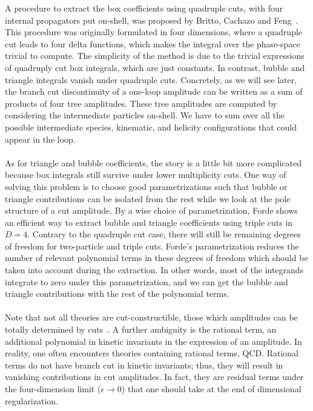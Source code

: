 A procedure to extract the box coefficients using quadruple cuts, \ie with four internal propagators put on-shell, was proposed by Britto, Cachazo and Feng~\cite{Britto:2004nc}. 
This procedure was originally formulated in four dimensions, where a quadruple cut leads to four delta functions, which makes the integral over the phase-space trivial to compute. 
The simplicity of the method is due to the trivial expressions of quadruply cut box integrals, which are just constants.
In contrast, bubble and triangle integrals vanish under quadruple cuts.
Concretely, as we will see later, the branch cut discontinuity of a one-loop amplitude can be written as a sum of products of four tree amplitudes.
These tree amplitudes are computed by considering the intermediate particles on-shell.
We have to sum over all the possible intermediate species, kinematic, and helicity configurations that could appear in the loop.
\\\\
As for triangle and bubble coefficients, the story is a little bit more complicated because box integrals still survive under lower multiplicity cuts.
One way of solving this problem is to choose good parametrizations such that bubble or triangle contributions can be isolated from the rest while we look at the pole structure of a cut amplitude.
By a wise choice of parametrization, Forde shows~\cite{Forde:2007mi} an efficient way to extract bubble and triangle coefficients using triple cuts in $D=4$.
Contrary to the quadruple cut case, there will still be remaining degrees of freedom for two-particle and triple cuts. 
Forde's parametrization reduces the number of relevant polynomial terms in these degrees of freedom which should be taken into account during the extraction. 
In other words, most of the integrands integrate to zero under this parametrization, and we can get the bubble and triangle contributions with the rest of the polynomial terms.
\\\\
Note that not all theories are cut-constructible, \ie those which amplitudes can be totally determined by cuts~\cite{Bern:1994cg}. 
A further ambiguity is the rational term, \ie an additional polynomial in kinetic invariants in the expression of an amplitude. 
In reality, one often encounters theories containing rational terms, \eg QCD.
Rational terms do not have branch cut in kinetic invariants; thus, they will result in vanishing contributions in cut amplitudes.
In fact, they are residual terms under the four-dimension limit ($\epsilon\rightarrow 0$) that one should take at the end of dimensional regularization.
